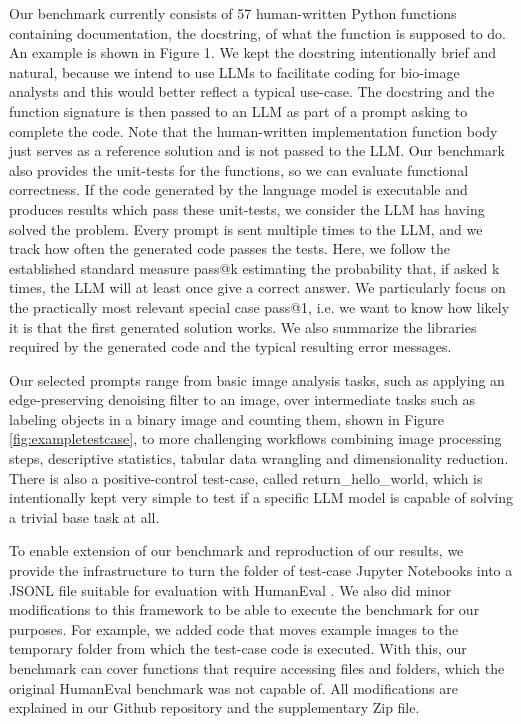 \documentclass{ecai}
\begin{document}
Our benchmark currently consists of 57 human-written Python functions containing documentation, the docstring, of what the function is supposed to do. An example is shown in Figure 1. We kept the docstring intentionally brief and natural, because we intend to use LLMs to facilitate coding for bio-image analysts and this would better reflect a typical use-case. The docstring and the function signature is then passed to an LLM as part of a prompt asking to complete the code. Note that the human-written implementation function body just serves as a reference solution and is not passed to the LLM. Our benchmark also provides the unit-tests for the functions, so we can evaluate functional correctness. If the code generated by the language model is executable and produces results which pass these unit-tests, we consider the LLM has having solved the problem. Every prompt is sent multiple times to the LLM, and we track how often the generated code passes the tests. Here, we follow the established standard measure pass@k \citep{chen2021evaluating} estimating the probability that, if asked k times, the LLM will at least once give a correct answer. We particularly focus on the practically most relevant special case pass@1, i.e. we want to know how likely it is that the first generated solution works. We also summarize the libraries required by the generated code and the typical resulting error messages. 


Our selected prompts range from basic image analysis tasks, such as applying an edge-preserving denoising filter to an image, over intermediate tasks such as labeling objects in a binary image and counting them, shown in Figure \ref{fig:exampletestcase}, to more challenging workflows combining image processing steps, descriptive statistics, tabular data wrangling and dimensionality reduction. There is also a positive-control test-case, called return\_hello\_world, which is intentionally kept very simple to test if a specific LLM model is  capable of solving a trivial base task at all. 

To enable extension of our benchmark and reproduction of our results, we provide the infrastructure to turn the folder of test-case Jupyter Notebooks into a JSONL file suitable for evaluation with HumanEval \citep{chen2021evaluating}. We also did minor modifications to this framework to be able to execute the benchmark for our purposes. For example, we added code that moves example images to the temporary folder from which the test-case code is executed. With this, our benchmark can cover functions that require accessing files and folders, which the original HumanEval benchmark was not capable of. All modifications are explained in our Github repository and the supplementary Zip file. 
\end{document}
